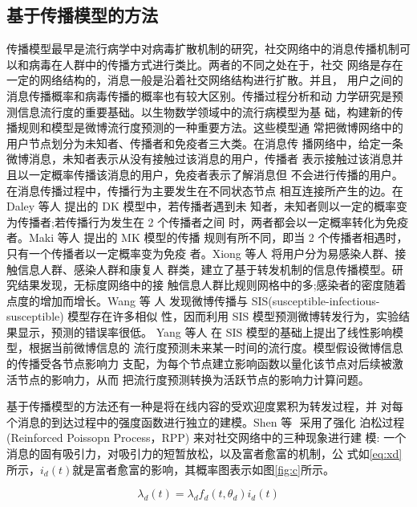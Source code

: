 \subsection{基于传播模型的方法}

传播模型最早是流行病学中对病毒扩散机制的研究，社交网络中的消息传播机制可以和病毒在人群中的传播方式进行类比。两者的不同之处在于，社交 网络是存在一定的网络结构的，消息一般是沿着社交网络结构进行扩散。并且， 用户之间的消息传播概率和病毒传播的概率也有较大区别。传播过程分析和动 力学研究是预测信息流行度的重要基础。以生物数学领域中的流行病模型为基 础，构建新的传播规则和模型是微博流行度预测的一种重要方法。这些模型通 常把微博网络中的用户节点划分为未知者、传播者和免疫者三大类。在消息传 播网络中，给定一条微博消息，未知者表示从没有接触过该消息的用户，传播者 表示接触过该消息并且以一定概率传播该消息的用户，免疫者表示了解消息但 不会进行传播的用户。在消息传播过程中，传播行为主要发生在不同状态节点 相互连接所产生的边。在 Daley 等人 \citep{Daley1965Stochastic}提出的 DK 模型中，若传播者遇到未 知者，未知者则以一定的概率变为传播者;若传播行为发生在 2 个传播者之间 时，两者都会以一定概率转化为免疫者。Maki 等人 \citep{Maki1973Mathematical} 提出的 MK 模型的传播 规则有所不同，即当 2 个传播者相遇时，只有一个传播者以一定概率变为免疫 者。Xiong 等人 \citep{Xiong2012An}将用户分为易感染人群、接触信息人群、感染人群和康复人 群类，建立了基于转发机制的信息传播模型。研究结果发现，无标度网络中的接 触信息人群比规则网格中的多;感染者的密度随着点度的增加而增长。Wang 等 人\citep{WANG2013ReTweeting} 发现微博传播与 SIS(susceptible-infectious-susceptible) 模型存在许多相似 性，因而利用 SIS 模型预测微博转发行为，实验结果显示，预测的错误率很低。 Yang 等人\citep{Yang2011Modeling} 在 SIS 模型的基础上提出了线性影响模型，根据当前微博信息的 流行度预测未来某一时间的流行度。模型假设微博信息的传播受各节点影响力 支配，为每个节点建立影响函数以量化该节点对后续被激活节点的影响力，从而 把流行度预测转换为活跃节点的影响力计算问题。


基于传播模型的方法还有一种是将在线内容的受欢迎度累积为转发过程，并 对每个消息的到达过程中的强度函数进行独立的建模。Shen 等 ­\citep{Shen2014Modeling} 采用了强化 泊松过程 (Reinforced Poissopn Process，RPP) 来对社交网络中的三种现象进行建 模: 一个消息的固有吸引力，对吸引力的短暂放松，以及富者愈富的机制，公 式如\ref{eq:xd}所示，$i_d(t)$就是富者愈富的影响，其概率图表示如图\ref{fig:c}所示。


\begin{equation}\label{eq:xd}
\lambda_d(t) = \lambda_d f_d(t,\theta_d)i_d(t)
\end{equation}



